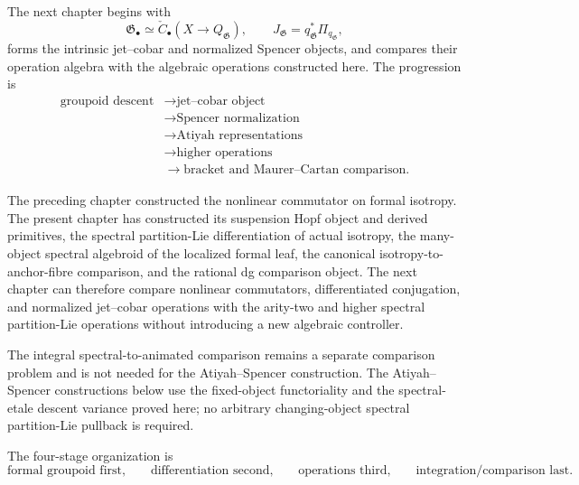 The next chapter begins with
\[
    \mathfrak G_\bullet
    \simeq
    \check C_\bullet
    \left(X\to Q_{\mathfrak G}\right),
    \qquad
    J_{\mathfrak G}=q_{\mathfrak G}^*\Pi_{q_{\mathfrak G}},
\]
forms the intrinsic jet--cobar and normalized Spencer objects, and compares
their operation algebra with the algebraic operations constructed here.  The
progression is
\[
\boxed{
\begin{aligned}
\text{groupoid descent}
&\longrightarrow \text{jet--cobar object}\\
&\longrightarrow \text{Spencer normalization}\\
&\longrightarrow \text{Atiyah representations}\\
&\longrightarrow \text{higher operations}\\
&\longrightarrow \text{bracket and Maurer--Cartan comparison}.
\end{aligned}}
\]

The preceding chapter constructed the nonlinear commutator on formal isotropy.
The present chapter has constructed its suspension Hopf object and derived
primitives, the spectral partition-Lie differentiation of actual isotropy,
the many-object spectral algebroid of the localized formal leaf, the canonical
isotropy-to-anchor-fibre comparison, and the rational dg comparison object.
The next chapter can therefore compare nonlinear commutators, differentiated
conjugation, and normalized jet--cobar operations with the arity-two and
higher spectral partition-Lie operations without introducing a new algebraic
controller.

The integral spectral-to-animated comparison remains a separate comparison
problem and is not needed for the Atiyah--Spencer construction.
The Atiyah--Spencer constructions below use the fixed-object functoriality and
the spectral-etale descent variance proved here; no arbitrary changing-object
spectral partition-Lie pullback is required.

The four-stage organization is
\[
\boxed{
\text{formal groupoid first,}
\qquad
\text{differentiation second,}
\qquad
\text{operations third,}
\qquad
\text{integration/comparison last.}}
\]
